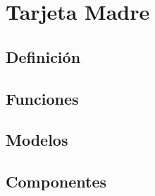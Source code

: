 \chapter{Tarjeta Madre}
\section{Definición}

\section{Funciones}

\section{Modelos}

\section{Componentes}

